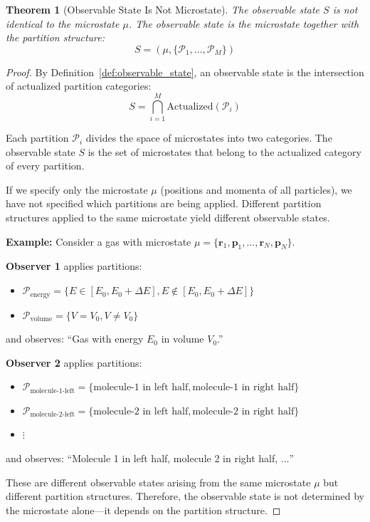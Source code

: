 \documentclass[twocolumn,10pt]{article}
\newtheorem{theorem}{Theorem}[section]
\theoremstyle{definition}
\theoremstyle{remark}
\begin{document}
\begin{theorem}[Observable State Is Not Microstate]
\label{thm:observable_not_micro}
The observable state $S$ is not identical to the microstate $\mu$. The observable state is the microstate together with the partition structure:
\begin{equation}
S = (\mu, \{\mathcal{P}_1, \ldots, \mathcal{P}_M\})
\end{equation}
\end{theorem}

\begin{proof}
By Definition~\ref{def:observable_state}, an observable state is the intersection of actualized partition categories:
\begin{equation}
S = \bigcap_{i=1}^{M} \text{Actualized}(\mathcal{P}_i)
\end{equation}

Each partition $\mathcal{P}_i$ divides the space of microstates into two categories. The observable state $S$ is the set of microstates that belong to the actualized category of every partition.

If we specify only the microstate $\mu$ (positions and momenta of all particles), we have not specified which partitions are being applied. Different partition structures applied to the same microstate yield different observable states.

\vspace{0.2cm}
\noindent\textbf{Example:} Consider a gas with microstate $\mu = \{\mathbf{r}_1, \mathbf{p}_1, \ldots, \mathbf{r}_N, \mathbf{p}_N\}$.

\textbf{Observer 1} applies partitions:
\begin{itemize}
\item $\mathcal{P}_{\text{energy}} = \{E \in [E_0, E_0 + \Delta E], E \notin [E_0, E_0 + \Delta E]\}$
\item $\mathcal{P}_{\text{volume}} = \{V = V_0, V \neq V_0\}$
\end{itemize}
and observes: ``Gas with energy $E_0$ in volume $V_0$.''

\textbf{Observer 2} applies partitions:
\begin{itemize}
\item $\mathcal{P}_{\text{molecule-1-left}} = \{\text{molecule-1 in left half}, \text{molecule-1 in right half}\}$
\item $\mathcal{P}_{\text{molecule-2-left}} = \{\text{molecule-2 in left half}, \text{molecule-2 in right half}\}$
\item $\vdots$
\end{itemize}
and observes: ``Molecule 1 in left half, molecule 2 in right half, $\ldots$''

These are different observable states arising from the same microstate $\mu$ but different partition structures. Therefore, the observable state is not determined by the microstate alone—it depends on the partition structure.
\end{proof}
\end{document}
